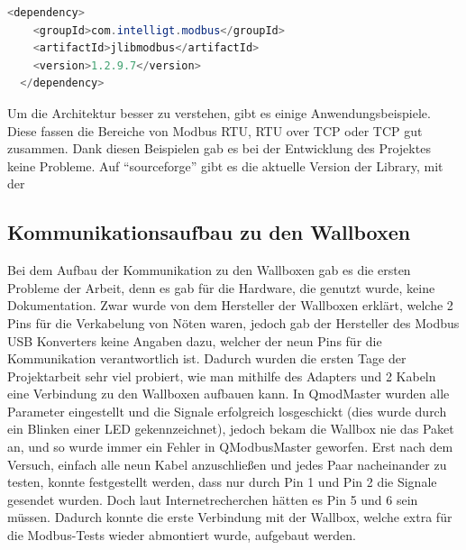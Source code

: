  \begin{lstlisting}[language=java,caption=Dependency in Pom.xml,label=lst:impl:foo]
    <dependency> 
    <groupId>com.intelligt.modbus</groupId> 
    <artifactId>jlibmodbus</artifactId> 
    <version>1.2.9.7</version> 
  </dependency> 
\end{lstlisting}


Um die Architektur besser zu verstehen, gibt es einige Anwendungsbeispiele. Diese fassen die Bereiche von Modbus RTU, RTU over TCP oder TCP gut zusammen. Dank diesen Beispielen gab es bei der Entwicklung des Projektes keine Probleme. Auf “sourceforge” gibt es die aktuelle Version der Library, mit der 

\subsection{Kommunikationsaufbau zu den Wallboxen }

Bei dem Aufbau der Kommunikation zu den Wallboxen gab es die ersten Probleme der Arbeit, denn es gab für die Hardware, die genutzt wurde, keine Dokumentation. Zwar wurde von dem Hersteller der Wallboxen erklärt, welche 2 Pins für die Verkabelung von Nöten waren, jedoch gab der Hersteller des Modbus USB Konverters keine Angaben dazu, welcher der neun Pins für die Kommunikation verantwortlich ist. Dadurch wurden die ersten Tage der Projektarbeit sehr viel probiert, wie man mithilfe des Adapters und 2 Kabeln eine Verbindung zu den Wallboxen aufbauen kann. In QmodMaster wurden alle Parameter eingestellt und die Signale erfolgreich losgeschickt (dies wurde durch ein Blinken einer LED gekennzeichnet), jedoch bekam die Wallbox nie das Paket an, und so wurde immer ein Fehler in QModbusMaster geworfen. Erst nach dem Versuch, einfach alle neun Kabel anzuschließen und jedes Paar nacheinander zu testen, konnte festgestellt werden, dass nur durch Pin 1 und Pin 2 die Signale gesendet wurden. Doch laut Internetrecherchen hätten es Pin 5 und 6 sein müssen. Dadurch konnte die erste Verbindung mit der Wallbox, welche extra für die Modbus-Tests wieder abmontiert wurde, aufgebaut werden.   

 

